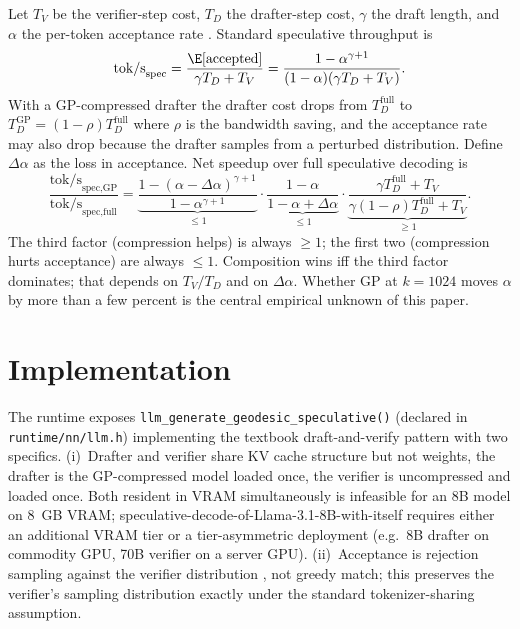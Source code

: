 \documentclass[11pt]{article}
\begin{document}
Let $T_V$ be the verifier-step cost, $T_D$ the drafter-step cost, $\gamma$
the draft length, and $\alpha$ the per-token acceptance rate
\cite{leviathan2023speculative}.  Standard speculative throughput is
\begin{equation}
\label{eq:spec}
\text{tok/s}_\text{spec}
= \frac{\E[\text{accepted}]}{\gamma T_D + T_V}
= \frac{1-\alpha^{\gamma+1}}{(1-\alpha)(\gamma T_D+T_V)}.
\end{equation}
With a GP-compressed drafter the drafter cost drops from
$T_D^\text{full}$ to $T_D^\text{GP}=(1-\rho)T_D^\text{full}$ where
$\rho$ is the bandwidth saving, and the acceptance rate may also drop
because the drafter samples from a perturbed distribution.  Define
$\Delta\alpha$ as the loss in acceptance.  Net speedup over full
speculative decoding is
\begin{equation}
\label{eq:netspeedup}
\frac{\text{tok/s}_\text{spec,GP}}{\text{tok/s}_\text{spec,full}}
=
\underbrace{\frac{1-(\alpha-\Delta\alpha)^{\gamma+1}}{1-\alpha^{\gamma+1}}}_{\leq 1}
\cdot
\underbrace{\frac{1-\alpha}{1-\alpha+\Delta\alpha}}_{\leq 1}
\cdot
\underbrace{\frac{\gamma T_D^\text{full}+T_V}{\gamma(1-\rho)T_D^\text{full}+T_V}}_{\geq 1}.
\end{equation}
The third factor (compression helps) is always $\geq 1$; the first two
(compression hurts acceptance) are always $\leq 1$.  Composition wins iff
the third factor dominates; that depends on $T_V/T_D$ and on $\Delta\alpha$.
Whether GP at $k{=}1024$ moves $\alpha$ by more than a few percent is the
central empirical unknown of this paper.

\section{Implementation}
The runtime exposes
\texttt{llm\_generate\_geodesic\_speculative()} (declared in
\texttt{runtime/nn/llm.h}) implementing the textbook draft-and-verify
pattern with two specifics.  (i)~Drafter and verifier share KV
cache structure but not weights, the drafter is the GP-compressed
model loaded once, the verifier is uncompressed and loaded once.  Both
resident in VRAM simultaneously is infeasible for an 8B model on 8~GB
VRAM; speculative-decode-of-Llama-3.1-8B-with-itself requires either an
additional VRAM tier or a tier-asymmetric deployment (e.g.\ 8B drafter
on commodity GPU, 70B verifier on a server GPU).  (ii)~Acceptance
is rejection sampling against the verifier distribution
\cite{leviathan2023speculative,chen2023speculative}, not greedy match;
this preserves the verifier's sampling distribution exactly under the
standard tokenizer-sharing assumption.
\end{document}
